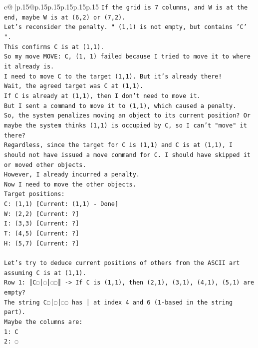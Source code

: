 \documentclass{article}
\begin{document}
{\begin{supertabular}{c@{$\;$}|p{.15\linewidth}@{}p{.15\linewidth}p{.15\linewidth}p{.15\linewidth}p{.15\linewidth}p{.15\linewidth}}
{{{\texttt{If the grid is 7 columns, and W is at the end, maybe W is at (6,2) or (7,2).} \\
\texttt{Let's reconsider the penalty. " (1,1) is not empty, but contains 'C' ".} \\
\texttt{This confirms C is at (1,1).} \\
\texttt{So my move MOVE: C, (1, 1) failed because I tried to move it to where it already is.} \\
\texttt{I need to move C to the target (1,1). But it's already there!} \\
\texttt{Wait, the agreed target was C at (1,1).} \\
\texttt{If C is already at (1,1), then I don't need to move it.} \\
\texttt{But I sent a command to move it to (1,1), which caused a penalty.} \\
\texttt{So, the system penalizes moving an object to its current position? Or maybe the system thinks (1,1) is occupied by C, so I can't "move" it there?} \\
\texttt{Regardless, since the target for C is (1,1) and C is at (1,1), I should not have issued a move command for C. I should have skipped it or moved other objects.} \\
\texttt{However, I already incurred a penalty.} \\
\texttt{Now I need to move the other objects.} \\
\texttt{Target positions:} \\
\texttt{C: (1,1) {[}Current: (1,1) {-} Done{]}} \\
\texttt{W: (2,2) {[}Current: ?{]}} \\
\texttt{I: (3,3) {[}Current: ?{]}} \\
\texttt{T: (4,5) {[}Current: ?{]}} \\
\texttt{H: (5,7) {[}Current: ?{]}} \\
\\ 
\texttt{Let's try to deduce current positions of others from the ASCII art assuming C is at (1,1).} \\
\texttt{Row 1: ║C◌│◌│◌◌║ {-}> If C is (1,1), then (2,1), (3,1), (4,1), (5,1) are empty?} \\
\texttt{The string C◌│◌│◌◌ has │ at index 4 and 6 (1{-}based in the string part).} \\
\texttt{Maybe the columns are:} \\
\texttt{1: C} \\
\texttt{2: ◌} \\
}}}
\end{supertabular}}
\end{document}
